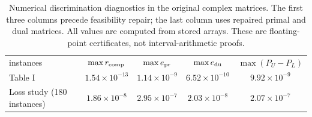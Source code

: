 \begin{table}[!htbp]
\centering
\begin{ruledtabular}
\begin{tabular}{lcccc}
instances & $\max r_{\rm comp}$ & $\max e_{\rm pr}$ & $\max e_{\rm du}$ & $\max(P_U-P_L)$\\
\colrule
Table I & $1.54\times10^{-13}$ & $1.14\times10^{-9}$ & $6.52\times10^{-10}$ & $9.92\times10^{-9}$\\
Loss study (180 instances) & $1.86\times10^{-8}$ & $2.95\times10^{-7}$ & $2.03\times10^{-8}$ & $2.07\times10^{-7}$\\
\end{tabular}
\end{ruledtabular}
\caption{Numerical discrimination diagnostics in the original complex matrices. The first three columns precede feasibility repair; the last column uses repaired primal and dual matrices. All values are computed from stored arrays. These are floating-point certificates, not interval-arithmetic proofs.}
\label{tab:diagnostics}
\end{table}
